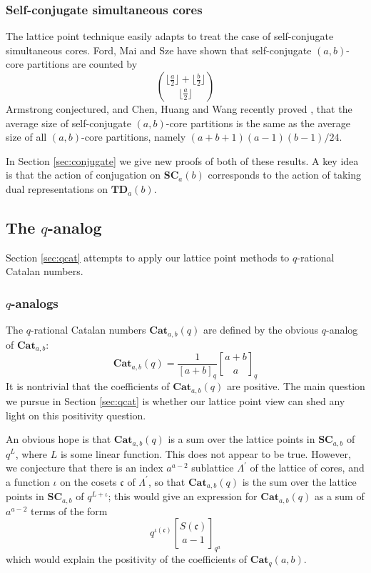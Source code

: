 \documentclass{amsart}[12pt]
\theoremstyle{definition}
\newcommand{\SC}{\mathbf{SC}}
\newcommand{\TD}{\mathbf{TD}}
\newcommand{\Cat}{\mathbf{Cat}}
\begin{document}
 \subsubsection{Self-conjugate simultaneous cores}
The lattice point technique easily adapts to treat the case of self-conjugate simultaneous cores.  Ford, Mai and Sze have shown \cite{FMS} that self-conjugate $(a,b)$-core partitions are counted by 
$$\binom{\big\lfloor \frac{a}{2} \big\rfloor +\big\lfloor \frac{b}{2} \big\rfloor}{\big\lfloor \frac{a}{2} \big\rfloor}$$
Armstrong conjectured,  and Chen, Huang and Wang recently proved \cite{CHW}, that the average size of self-conjugate $(a,b)$-core partitions is the same as the average size of all $(a,b)$-core partitions, namely $(a+b+1)(a-1)(b-1)/24$.  

In Section \ref{sec:conjugate} we give new proofs of both of these results.  A key idea is that the action of conjugation on $\SC_a(b)$ corresponds to the action of taking dual representations on $\TD_a(b)$.  

\subsection{The \texorpdfstring{$q$}{q}-analog}

Section \ref{sec:qcat} attempts to apply our lattice point methods to $q$-rational Catalan numbers.

\subsubsection{$q$-analogs}
The $q$-rational Catalan numbers $\Cat_{a,b}(q)$ are defined by the obvious $q$-analog of $\Cat_{a,b}$:
$$\Cat_{a,b}(q)=\frac{1}{[a+b]_q}{a+b \brack a}_q$$
It is nontrivial that the coefficients of $\Cat_{a,b}(q)$ are positive.  The main question we pursue in Section \ref{sec:qcat} is whether our lattice point view can shed any light on this positivity question.

An obvious hope is that $\Cat_{a,b}(q)$ is a sum over the lattice points in $\SC_{a,b}$ of $q^L$, where $L$ is some linear function.  This does not appear to be true.  However, we conjecture that there is an index $a^{a-2}$ sublattice $\Lambda^\prime$ of the lattice of cores, and a function $\iota$ on the cosets $\mathfrak{c}$ of $\Lambda^\prime$, so that $\Cat_{a,b}(q)$ is the sum over the lattice points in $\SC_{a,b}$ of $q^{L+\iota}$; this would give an expression for $\Cat_{a,b}(q)$ as a sum of $a^{a-2}$ terms of the form 
$$q^{\iota(\mathfrak{c})}{S(\mathfrak{c}) \brack a-1}_{q^a}$$
which would explain the positivity of the coefficients of $\Cat_q(a,b)$.  
\end{document}
